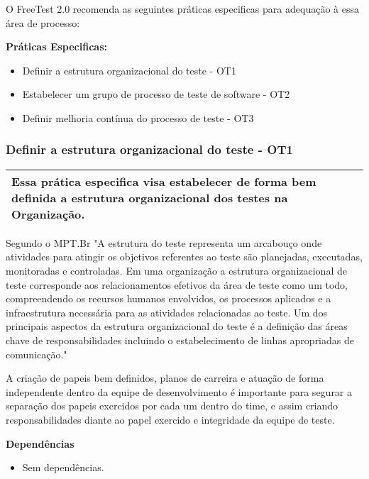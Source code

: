 O FreeTest 2.0 recomenda as seguintes práticas especificas para adequação à essa área de processo:

\textbf{Práticas Especificas:}

\begin{itemize}    
    \item Definir a estrutura organizacional do teste - OT1
    \item Estabelecer um grupo de processo de teste de software - OT2
    \item Definir melhoria contínua do processo de teste - OT3
\end{itemize}

\subsubsection{Definir a estrutura organizacional do teste - OT1}
\label{sec:tca1}

\begin{table}[H]
\centering
\begin{tabular}{|p{130mm}|}
\hline
 Essa prática especifica visa estabelecer de forma bem definida a estrutura organizacional dos testes na Organização.\\ 
\hline
\end{tabular}
\end{table}

Segundo o MPT.Br \cite{GuiaMPTbr} "A estrutura do teste representa um arcabouço onde atividades para atingir os objetivos referentes ao teste são planejadas, executadas, monitoradas e controladas. Em uma organização a estrutura organizacional de teste corresponde aos relacionamentos efetivos da área de teste como um todo, compreendendo os recursos humanos envolvidos, os processos aplicados e a infraestrutura necessária para as atividades relacionadas ao teste. Um dos principais aspectos da estrutura organizacional do teste é a definição das áreas chave de responsabilidades incluindo o estabelecimento de linhas apropriadas de comunicação."

A criação de papeis bem definidos, planos de carreira e atuação de forma independente dentro da equipe de desenvolvimento é importante para segurar a separação dos papeis exercidos por cada um dentro do time, e assim criando responsabilidades diante ao papel exercido e integridade da equipe de teste.

\textbf{Dependências}
\begin{itemize}
    \item Sem dependências.
\end{itemize}

